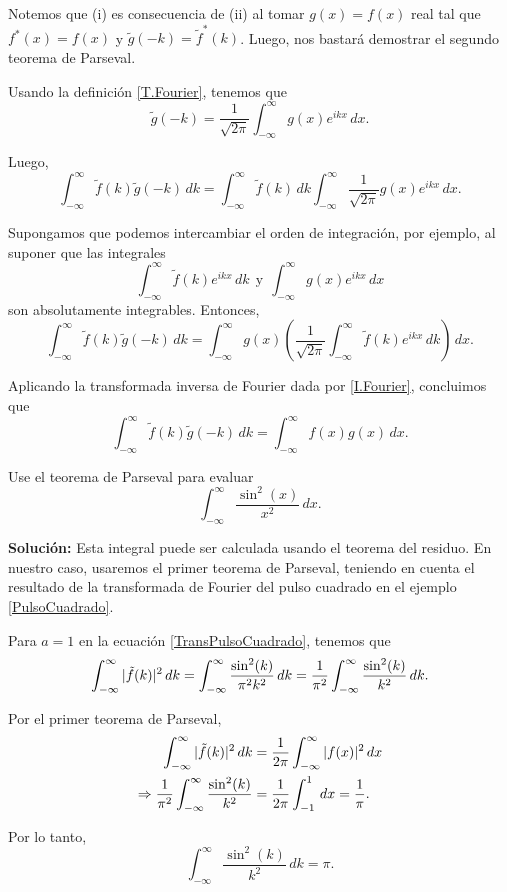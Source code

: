 \begin{demo}
Notemos que (i) es consecuencia de (ii) al tomar $g(x) = f(x)$ real tal que $f^*(x) = f(x)$ y $\tilde{g}(-k) = \tilde{f}^*(k)$. Luego, nos bastará demostrar el segundo teorema de Parseval.

Usando la definición \eqref{T.Fourier}, tenemos que 
$$\tilde{g}(-k) = \frac{1}{\sqrt{2\pi}} \int_{-\infty}^{\infty} g(x) e^{ikx} \,dx.$$

Luego, 
$$\int_{-\infty}^{\infty} \tilde{f}(k) \tilde{g}(-k) \,dk = \int_{-\infty}^{\infty} \tilde{f}(k) \,dk \int_{-\infty}^{\infty} \frac{1}{\sqrt{2\pi}} g(x) e^{ikx} \,dx.$$

Supongamos que podemos intercambiar el orden de integración, por ejemplo, al suponer que las integrales 
$$\int_{-\infty}^{\infty} \tilde{f}(k) e^{ikx} \,dk ~~\mbox{y}~~ \int_{-\infty}^{\infty} g(x) e^{ikx} \,dx$$
son absolutamente integrables. Entonces,
$$\int_{-\infty}^{\infty} \tilde{f}(k) \tilde{g}(-k) \,dk = \int_{-\infty}^{\infty} g(x) \left( \frac{1}{\sqrt{2\pi}} \int_{-\infty}^{\infty} \tilde{f}(k) e^{ikx} \,dk\right) \,dx.$$

Aplicando la transformada inversa de Fourier dada por \eqref{I.Fourier}, concluimos que
$$\int_{-\infty}^{\infty} \tilde{f}(k) \tilde{g}(-k) \,dk = \int_{-\infty}^{\infty} f(x) g(x)  \,dx.$$

\end{demo}

\begin{ejemplo}
    Use el teorema de Parseval para evaluar
    $$\int_{-\infty}^{\infty}  \frac{\sin^2(x)}{x^2} \,dx.$$

    \textbf{Solución:} Esta integral puede ser calculada usando el teorema del residuo. En nuestro caso, usaremos el primer teorema de Parseval, teniendo en cuenta el resultado de la transformada de Fourier del pulso cuadrado en el ejemplo \ref{PulsoCuadrado}. 

    Para $a = 1$ en la ecuación \eqref{TransPulsoCuadrado}, tenemos que
    $$\int_{- \infty}^{\infty} |\Tilde{f}(k)|^2 \,dk = \int_{- \infty}^{\infty} \frac{\sin^2(k)}{\pi^2 k^2}  \,dk = \frac{1}{\pi^2} \int_{-\infty}^{\infty}  \frac{\sin^2(k)}{k^2} \,dk.$$

    Por el primer teorema de Parseval,
    \begin{align*}
        \int_{- \infty}^{\infty} |\Tilde{f}(k)|^2 \,dk &= \frac{1}{2\pi} \int_{-\infty}^{\infty} |f(x)|^2 \,dx \\
        \Rightarrow \frac{1}{\pi^2} \int_{-\infty}^{\infty}  \frac{\sin^2(k)}{k^2} &= \frac{1}{2\pi} \int_{-1}^1 \,dx = \frac{1}{\pi}. 
    \end{align*}

Por lo tanto,
$$\int_{-\infty}^{\infty}  \frac{\sin^2(k)}{k^2} \,dk = \pi.$$
\end{ejemplo}


